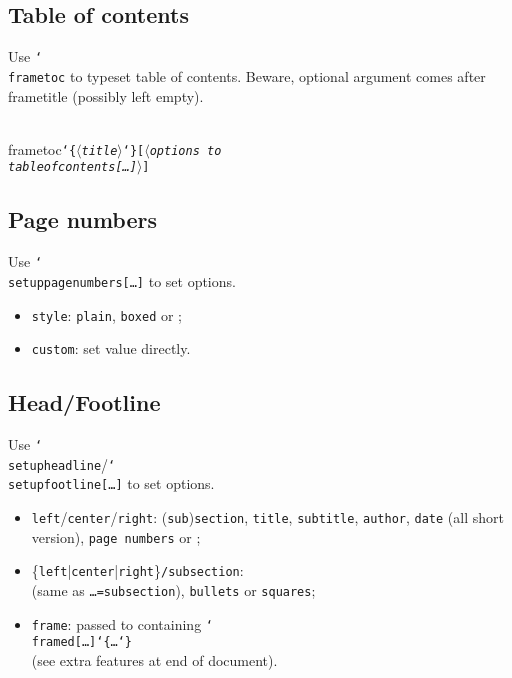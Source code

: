 \documentclass[utf8, a4paper]{beamer}
\newcommand*\cs[1]{\texttt{\char`\\#1}}
\newcommand*\meta[1]{\ensuremath{\langle}{\em#1}\ensuremath{\rangle}}
\newcommand*\marg[1]{\texttt{\char`\{#1\char`\}}}
\newcommand*\oarg[1]{\texttt{[#1]}}
\let\type\texttt
\newcommand*\default[1]{\underbar{#1}}
\begin{document}

\subsection{Table of contents}

\begin{frame}[fragile]

  Use \cs{frametoc} to typeset table of contents. \alert{Beware},
  optional argument comes \alert{after} frametitle (possibly left
  empty).
\begin{semiverbatim}
\\frametoc\marg{\meta{title}}\oarg{\meta{options to \\tableofcontents\oarg{…}}}
\end{semiverbatim}

\end{frame}


\subsection{Page numbers}

\begin{frame}[fragile]

  Use \cs{setuppagenumbers}\oarg{…} to set options.
  \begin{itemize}
  \item \type{style}: \type{plain}, \type{boxed} or
    \type{\default{none}};
  \item \type{custom}: set value directly.
  \end{itemize}

\end{frame}


\subsection{Head/Footline}

\begin{frame}

  Use \cs{setupheadline}/\cs{setupfootline}\oarg{…} to set options.
  \begin{itemize}
  \item \type{left}/\type{center}/\type{right}:
    (\type{sub})\type{section}, \type{title}, \type{subtitle},
    \type{author}, \type{date} (all short version), \type{page~numbers}
    or \type{\default{empty}};
  \item \{\type{left}|\type{center}|\type{right}\}\type{/subsection}:\\
    \type{\default{text}} (same as \type{…=subsection}), \type{bullets}
    or \type{squares};
  \item \type{frame}: passed to containing \cs{framed}\oarg{…}\marg{…}\\
    (see extra features at end of document).
  \end{itemize}

\end{frame}
\end{document}
